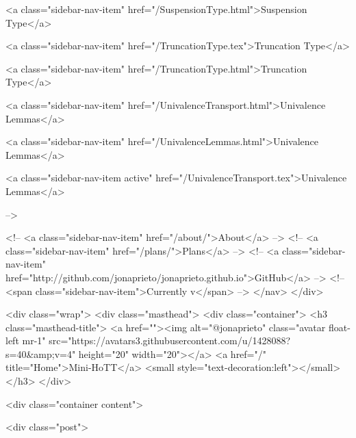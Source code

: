       
    
      
        
          <a class="sidebar-nav-item" href="/SuspensionType.html">Suspension Type</a>
        
      
    
      
        
          <a class="sidebar-nav-item" href="/TruncationType.tex">Truncation Type</a>
        
      
    
      
        
          <a class="sidebar-nav-item" href="/TruncationType.html">Truncation Type</a>
        
      
    
      
        
          <a class="sidebar-nav-item" href="/UnivalenceTransport.html">Univalence Lemmas</a>
        
      
    
      
        
          <a class="sidebar-nav-item" href="/UnivalenceLemmas.html">Univalence Lemmas</a>
        
      
    
      
        
          <a class="sidebar-nav-item active" href="/UnivalenceTransport.tex">Univalence Lemmas</a>
        
      
     -->

    <!-- <a class="sidebar-nav-item" href="/about/">About</a> -->
    <!-- <a class="sidebar-nav-item" href="/plans/">Plans</a> -->
    <!-- <a class="sidebar-nav-item" href="http://github.com/jonaprieto/jonaprieto.github.io">GitHub</a> -->
    <!-- <span class="sidebar-nav-item">Currently v</span> -->
  </nav>
</div>

    <div class="wrap">
      <div class="masthead">
        <div class="container">
          <h3 class="masthead-title">
            <a href=""><img alt="@jonaprieto" class="avatar float-left mr-1" src="https://avatars3.githubusercontent.com/u/1428088?s=40&amp;v=4" height="20" width="20"></a>
            <a href="/" title="Home">Mini-HoTT</a>
            <small style="text-decoration:left"></small>
          </h3>
        </div>
      
      <div class="container content">
        







<div class="post">

